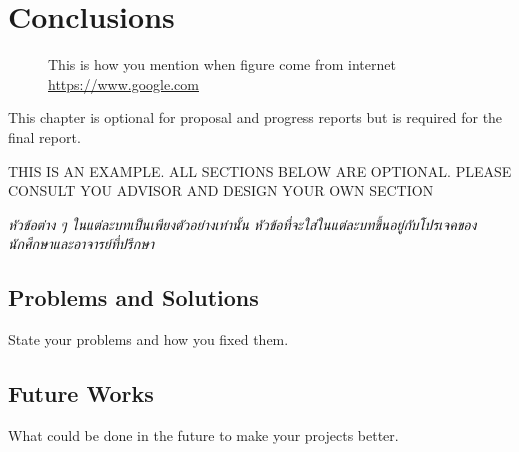 \documentclass[12pt,oneside,openright,a4paper]{cpe-english-project}
\begin{document}
\chapter{Conclusions}

 \begin{figure}[!h]
\caption{This is how you mention when figure come from internet  \href{https://www.google.com} {https://www.google.com}}\label{fig:x1}
\end{figure}

This chapter is optional for proposal and progress reports but 
is required for the final report.

THIS IS AN EXAMPLE. ALL SECTIONS BELOW ARE OPTIONAL. PLEASE CONSULT YOU ADVISOR AND DESIGN YOUR OWN SECTION

\emph{\textthai{หัวข้อต่าง ๆ ในแต่ละบทเป็นเพียงตัวอย่างเท่านั้น หัวข้อที่จะใส่ในแต่ละบทขึ้นอยู่กับโปรเจคของนักศึกษาและอาจารย์ที่ปรึกษา}}

\section{Problems and Solutions}
State your problems and how you fixed them.

\section{Future Works}
What could be done in the future to make your projects better.



\makeatletter
\g@addto@macro{\UrlBreaks}{\UrlOrds}
\makeatother
% 




 \\
\end{document}
